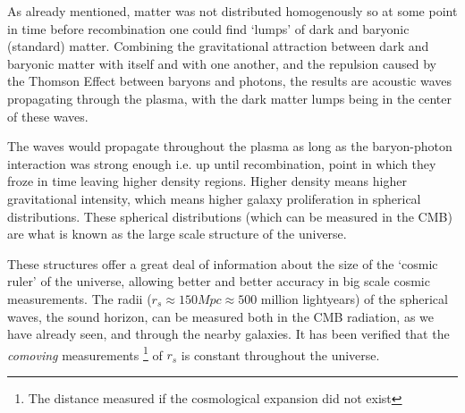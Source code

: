As already mentioned, matter was not distributed homogenously so at some point in time before recombination one could find `lumps' of dark and baryonic (standard) matter. Combining the gravitational attraction between dark and baryonic matter with itself and with one another, and the repulsion caused by the Thomson Effect between baryons and photons, the results are acoustic waves propagating through the plasma, with the dark matter lumps being in the center of these waves. 

The waves would propagate throughout the plasma as long as the baryon-photon interaction was strong enough i.e. up until recombination, point in which they froze in time leaving higher density regions. Higher density means higher gravitational intensity, which means higher galaxy proliferation in spherical distributions. These spherical distributions (which can be measured in the CMB) are what is known as the large scale structure of the universe.

These structures offer a great deal  of information about the size of the `cosmic ruler' of the universe, allowing better and better accuracy in big scale cosmic measurements. The radii ($r_s \approx 150 Mpc \approx 500 $ million lightyears) of the spherical waves, the sound horizon, can be measured both in the CMB radiation, as we have already seen, and through the nearby galaxies. It has been verified that the \textit{comoving} measurements \footnote{The distance measured if the cosmological expansion did not exist} of $r_s$ is constant throughout the universe.

